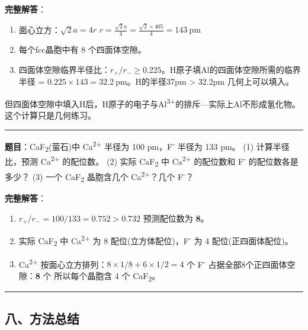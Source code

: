 \textbf{完整解答}：

\begin{enumerate}
\def\labelenumi{(\arabic{enumi})}
\item
  面心立方：\(\sqrt{2}a = 4r\) \箭 \(r = \frac{\sqrt{2}a}{4} = \frac{\sqrt{2} \times 405}{4} = 143\ \mathrm{pm}\)
\item
  每个fcc晶胞中有 8 个四面体空隙。
\item
  四面体空隙临界半径比：\(r_+/r_- \geq 0.225\)。H原子填Al的四面体空隙所需的临界半径 = \(0.225 \times 143 = 32.2\ \mathrm{pm}\)。H的半径37pm \textgreater{} 32.2pm \箭 几何上可以填入。
\end{enumerate}

但四面体空隙中填入H后，H原子的电子与Al\textsuperscript{3+}的排斥---实际上Al不形成氢化物。这个计算只是几何练习。

\begin{center}\rule{0.5\linewidth}{0.5pt}\end{center}

\textbf{题目}：CaF\textsubscript{2}(萤石)中 Ca\textsuperscript{2+} 半径为 100 pm，F\textsuperscript{-} 半径为 133 pm。
(1) 计算半径比，预测 Ca\textsuperscript{2+} 的配位数。
(2) 实际 CaF\textsubscript{2} 中 Ca\textsuperscript{2+} 的配位数和 F\textsuperscript{-} 的配位数各是多少？
(3) 一个 CaF\textsubscript{2} 晶胞含几个 Ca\textsuperscript{2+}？几个 F\textsuperscript{-}？

\textbf{完整解答}：

\begin{enumerate}
\def\labelenumi{(\arabic{enumi})}
\item
  \(r_+/r_- = 100/133 = 0.752 > 0.732\) \箭 预测配位数为 \textbf{8}。
\item
  实际 CaF\textsubscript{2} 中 Ca\textsuperscript{2+} 为 8 配位(立方体配位)，F\textsuperscript{-} 为 4 配位(正四面体配位)。
\item
  Ca\textsuperscript{2+} 按面心立方排列：\(8 \times 1/8 + 6 \times 1/2 = 4\) 个
  F\textsuperscript{-} 占据全部8个正四面体空隙：\textbf{8} 个
  所以每个晶胞含 4 个 CaF\textsubscript{2}。
\end{enumerate}

\begin{center}\rule{0.5\linewidth}{0.5pt}\end{center}

\subsection{八、方法总结}\label{ux516bux65b9ux6cd5ux603bux7ed3}

